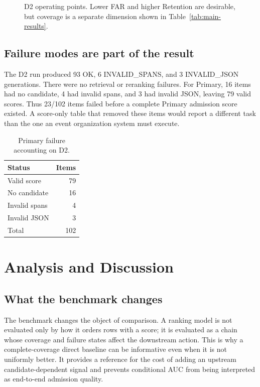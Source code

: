 \documentclass[5p,times]{elsarticle}
\begin{document}
\begin{figure}[t]
  \centering
  
  \caption{D2 operating points. Lower FAR and higher Retention are desirable, but coverage is a separate dimension shown in Table~\ref{tab:main-results}.}
  \label{fig:tradeoff}
\end{figure}

\subsection{Failure modes are part of the result}

The D2 run produced 93 OK, 6 INVALID\_SPANS, and 3 INVALID\_JSON generations. There were no retrieval or reranking failures. For Primary, 16 items had no candidate, 4 had invalid spans, and 3 had invalid JSON, leaving 79 valid scores. Thus 23/102 items failed before a complete Primary admission score existed. A score-only table that removed these items would report a different task than the one an event organization system must execute.

\begin{table}[t]
\centering
\caption{Primary failure accounting on D2.}
\label{tab:failures}
\small
\begin{tabular}{@{}lr@{}}
\toprule
Status & Items \\
\midrule
Valid score & 79 \\
No candidate & 16 \\
Invalid spans & 4 \\
Invalid JSON & 3 \\
Total & 102 \\
\bottomrule
\end{tabular}
\end{table}

\section{Analysis and Discussion}
\label{sec:discussion}

\subsection{What the benchmark changes}

The benchmark changes the object of comparison. A ranking model is not evaluated only by how it orders rows with a score; it is evaluated as a chain whose coverage and failure states affect the downstream action. This is why a complete-coverage direct baseline can be informative even when it is not uniformly better. It provides a reference for the cost of adding an upstream candidate-dependent signal and prevents conditional AUC from being interpreted as end-to-end admission quality.
\end{document}
